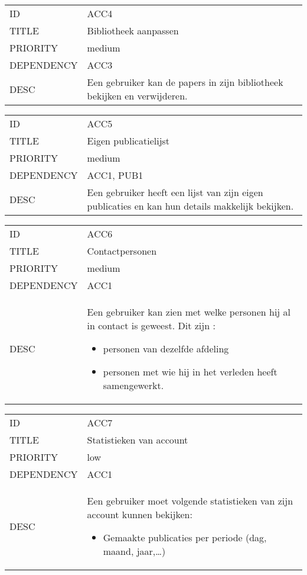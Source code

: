 \begin{longtable}{lp{10cm}}
ID           & ACC4\\
TITLE        & Bibliotheek aanpassen\\
PRIORITY     & medium\\
DEPENDENCY   & ACC3\\
DESC         & Een gebruiker kan de papers in zijn bibliotheek bekijken en verwijderen.    
\end{longtable}

\begin{longtable}{lp{10cm}}
ID           & ACC5\\
TITLE        & Eigen publicatielijst\\
PRIORITY     & medium\\
DEPENDENCY   & ACC1, PUB1\\
DESC         & Een gebruiker heeft een lijst van zijn eigen publicaties en kan hun details makkelijk bekijken.  
\end{longtable}

\begin{longtable}{lp{10cm}}
ID           & ACC6\\
TITLE        & Contactpersonen\\
PRIORITY     & medium\\
DEPENDENCY   & ACC1\\
DESC         & Een gebruiker kan zien met welke personen hij al in contact is geweest.
Dit zijn :
\begin{itemize}
\item personen van dezelfde afdeling
\item personen met wie hij in het verleden heeft samengewerkt.
\end{itemize}    
\end{longtable}

\begin{longtable}{lp{10cm}}
ID           & ACC7\\
TITLE        & Statistieken van account\\
PRIORITY     & low\\
DEPENDENCY   & ACC1\\
DESC         & Een gebruiker moet volgende statistieken van zijn account kunnen bekijken:
\begin{itemize}
\item Gemaakte publicaties per periode (dag, maand, jaar,\ldots)
\end{itemize}
\end{longtable}

